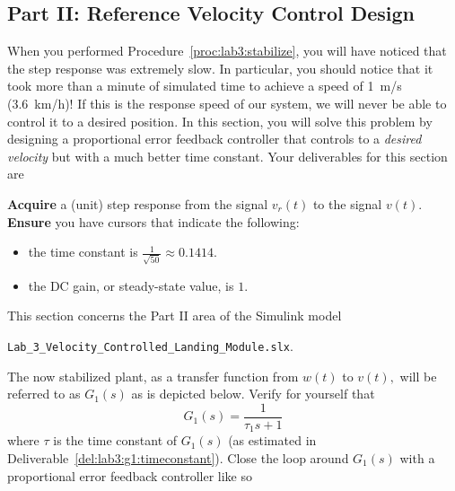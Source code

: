 \subsection{Part II: Reference Velocity Control Design}\label{Lab:3:Part:II}
When you performed Procedure~\ref{proc:lab3:stabilize}, you will have noticed that the step response was extremely slow.
In particular, you should notice that it took more than a minute of simulated time to achieve a speed of \SI{1}{m/s} (\SI{3.6}{km/h})!
If this is the response speed of our system, we will never be able to control it to a desired position.
In this section, you will solve this problem by designing a proportional error feedback controller that controls to a \emph{desired velocity} but with a much better time constant.
Your deliverables for this section are
%
\begin{deliverable}[label={del:lab3:g2:1}]
  \textbf{Acquire} a (unit) step response from the signal \(v_r(t)\) to the signal \(v(t).\)
  \textbf{Ensure} you have cursors that indicate the following:
  \begin{itemize}
    \item{the time constant is \(\frac{1}{\sqrt{50}} \approx 0.1414.\)}
    \item{the DC gain, or steady-state value, is \(1.\)}
  \end{itemize}
\end{deliverable}
%
This section concerns the Part II area of the Simulink model
\begin{center}
  \texttt{Lab\_3\_Velocity\_Controlled\_Landing\_Module.slx}.
\end{center}
The now stabilized plant, as a transfer function from \(w(t)\) to \(v(t),\) will be referred to as \(G_1(s)\) as is depicted below.
Verify for yourself that
\[
  G_1(s) = \frac{1}{\tau_1 s + 1}
\]
where \(\tau\) is the time constant of \(G_1(s)\) (as estimated in Deliverable~\ref{del:lab3:g1:timeconstant}).
Close the loop around \(G_1(s)\) with a proportional error feedback controller like so
%
